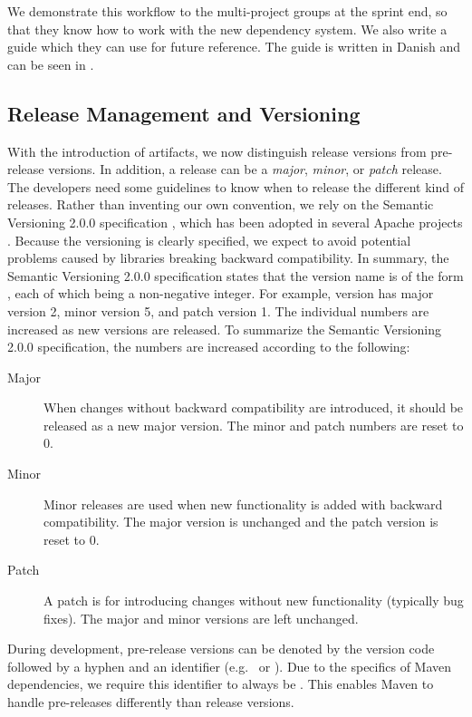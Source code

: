 We demonstrate this workflow to the multi-project groups at the sprint end, so that they know how to work with the new dependency system. We also write a guide which they can use for future reference. The guide is written in Danish and can be seen in .

\subsection{Release Management and Versioning}\label{subsec:release-management}
With the introduction of artifacts, we now distinguish release versions from pre-release versions. In addition, a release can be a \emph{major}, \emph{minor}, or \emph{patch} release. The developers need some guidelines to know when to release the different kind of releases. Rather than inventing our own convention, we rely on the Semantic Versioning 2.0.0 specification \parencite{semver2015}, which has been adopted in several Apache projects \parencite{apacheapr,apacheisis,apacheaccumulo}. Because the versioning is clearly specified, we expect to avoid potential problems caused by libraries breaking backward compatibility. In summary, the Semantic Versioning 2.0.0 specification states that the version name is of the form , each of which being a non-negative integer. For example, version  has major version 2, minor version 5, and patch version 1. The individual numbers are increased as new versions are released. To summarize the Semantic Versioning 2.0.0 specification, the numbers are increased according to the following:
\begin{description}
  \item[Major] When changes without backward compatibility are introduced, it should be released as a new major version. The minor and patch numbers are reset to 0.
  \item[Minor] Minor releases are used when new functionality is added with backward compatibility. The major version is unchanged and the patch version is reset to 0.
  \item[Patch] A patch is for introducing changes without new functionality (typically bug fixes). The major and minor versions are left unchanged.
\end{description}

During development, pre-release versions can be denoted by the version code followed by a hyphen and an identifier (e.g.\  or ). Due to the specifics of Maven dependencies, we require this identifier to always be . This enables Maven to handle pre-releases differently than release versions.

